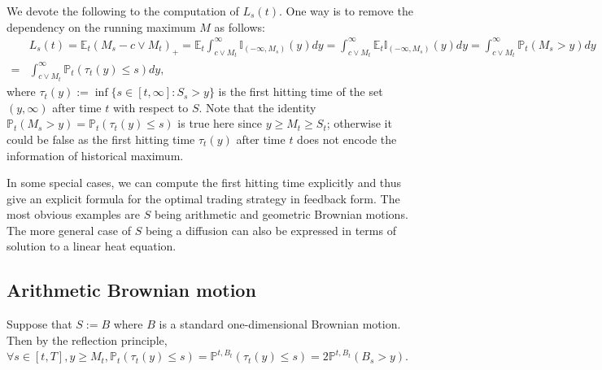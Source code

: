 \documentclass[openany,oneside]{article}
\theoremstyle{definition}
\theoremstyle{remark}
\newcommand{\E}{\mathbb{E}} %
\renewcommand{\P}{\mathbb{P}} %
\newcommand{\I}{\mathbb{I}} %
\begin{document}
We devote the following to the computation of $L_s(t)$. One way is to remove the dependency on the running maximum $M$ as follows:
\begin{align*}
& L_s(t) = \E_t(M_s-c\vee M_t)_+ = \E_t \int_{c\vee M_t}^{\infty}\I_{(-\infty,M_s)}(y) dy = \int_{c\vee M_t}^\infty \E_t \I_{(-\infty,M_s)}(y)dy = \int_{c\vee M_t}^\infty \P_t(M_s > y) dy \\
=& \int_{c\vee M_t}^\infty \P_t(\tau_t(y) \le s) dy,
\end{align*}
where $\tau_t(y):=\inf\{s\in[t,\infty] : S_s> y\}$ is the first hitting time of the set $(y,\infty)$ after time $t$ with respect to $S$. Note that the identity $\P_t(M_s > y) = \P_t(\tau_t(y)\le s)$ is true here since $y\ge M_t\ge S_t$; otherwise it could be false as the first hitting time $\tau_t(y)$ after time $t$ does not encode the information of historical maximum.

In some special cases, we can compute the first hitting time explicitly and thus give an explicit formula for the optimal trading strategy in feedback form. The most obvious examples are $S$ being arithmetic and geometric Brownian motions. The more general case of $S$ being a diffusion can also be expressed in terms of solution to a linear heat equation.

\subsection{Arithmetic Brownian motion}
Suppose that $S:=B$ where $B$ is a standard one-dimensional Brownian motion. Then by the reflection principle, $\forall s\in[t,T], y\ge M_t, \P_t(\tau_t(y)\le s) = \P^{t,B_t}(\tau_t(y)\le s) = 2\P^{t,B_t}(B_s>y)$.
\end{document}
